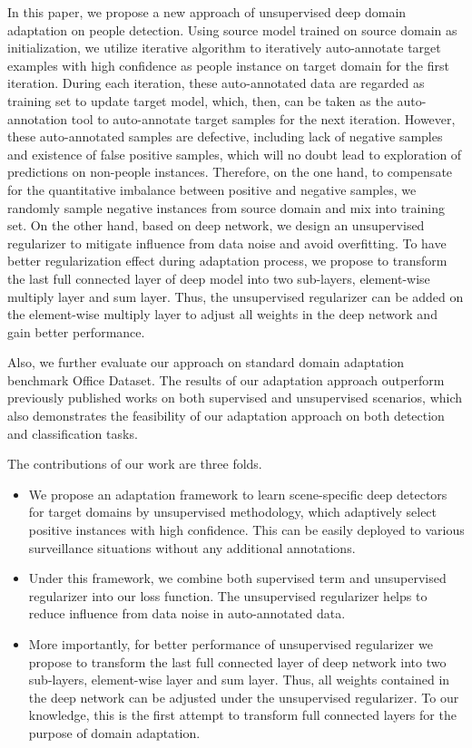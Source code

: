 \documentclass[runningheads]{llncs}
\begin{document}
In this paper, we propose a new approach of unsupervised deep domain adaptation on people detection. Using source model trained on source domain as initialization, we utilize iterative algorithm to iteratively auto-annotate target examples with high confidence as people instance on target domain for the first iteration. During each iteration, these auto-annotated data are regarded as training set to update target model, which, then, can be taken as the auto-annotation tool to auto-annotate target samples for the next iteration. However, these auto-annotated samples are defective, including lack of negative samples and existence of false positive samples, which will no doubt lead to exploration of predictions on non-people instances. Therefore, on the one hand, to compensate for the quantitative imbalance between positive and negative samples, we randomly sample negative instances from source domain and mix into training set. On the other hand, based on deep network, we design an unsupervised regularizer to mitigate influence from data noise and avoid overfitting. To have better regularization effect during adaptation process, we propose to transform the last full connected layer of deep model into two sub-layers, element-wise multiply layer and sum layer. Thus, the unsupervised regularizer can be added on the element-wise multiply layer to adjust all weights in the deep network and gain better performance.

Also, we further evaluate our approach on standard domain adaptation benchmark Office Dataset. The results of our adaptation approach outperform previously published works on both supervised and unsupervised scenarios, which also demonstrates the feasibility of our adaptation approach on both detection and classification tasks.

The contributions of our work are three folds.
\begin{itemize}
\item We propose an adaptation framework to learn scene-specific deep detectors for target domains by unsupervised methodology, which adaptively select positive instances with high confidence. This can be easily deployed to various surveillance situations without any additional annotations.
\item Under this framework, we combine both supervised term and unsupervised regularizer into our loss function. The unsupervised regularizer helps to reduce influence from data noise in auto-annotated data.
\item More importantly, for better performance of unsupervised regularizer we propose to transform the last full connected layer of deep network into two sub-layers, element-wise layer and sum layer. Thus, all weights contained in the deep network can be adjusted under the unsupervised regularizer. To our knowledge, this is the first attempt to transform full connected layers for the purpose of domain adaptation.
\end{itemize}
\end{document}
